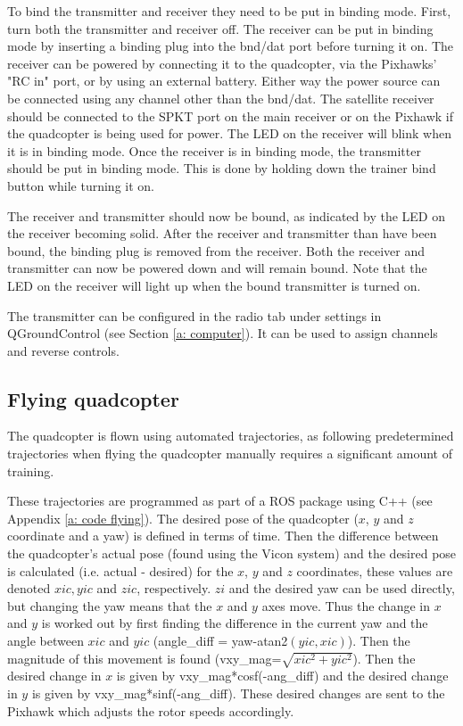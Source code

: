 \documentclass[12pt,a4paper]{article}
\begin{document}
    To bind the transmitter and receiver they need to be put in binding mode. First, turn both the transmitter and receiver off. The receiver can be put in binding mode by inserting a binding plug into the bnd/dat port before turning it on. The receiver can be powered by connecting it to the quadcopter, via the Pixhawks' "RC in" port, or by using an external battery. Either way the power source can be connected using any channel other than the bnd/dat. The satellite receiver should be connected to the SPKT port on the main receiver or on the Pixhawk if the quadcopter is being used for power. The LED on the receiver will blink when it is in binding mode. Once the receiver is in binding mode, the transmitter should be put in binding mode. This is done by holding down the trainer bind button while turning it on.
     
    The receiver and transmitter should now be bound, as indicated by the LED on the receiver becoming solid. After the receiver and transmitter than have been bound, the binding plug is removed from the receiver. Both the receiver and transmitter can now be powered down and will remain bound. Note that the LED on the receiver will light up when the bound transmitter is turned on.
     
    The transmitter can be configured in the radio tab under settings in QGroundControl (see Section \ref{a: computer}). It can be used to assign channels and reverse controls. 

  \subsection{Flying quadcopter}
    \label{ssec: flying quad}
    The quadcopter is flown using automated trajectories, as following predetermined trajectories when flying the quadcopter manually requires a significant amount of training. 
     
    These trajectories are programmed as part of a ROS package using C++ (see Appendix \ref{a: code flying}). The desired pose of the quadcopter ($x$, $y$ and $z$ coordinate and a yaw) is defined in terms of time. Then the difference between the quadcopter's actual pose (found using the Vicon system) and the desired pose is calculated (i.e. actual - desired) for the $x$, $y$ and $z$ coordinates, these values are denoted $xic,yic$ and $zic$, respectively. $zi$ and the desired yaw can be used directly, but changing the yaw means that the $x$ and $y$ axes move. Thus the change in $x$ and $y$ is worked out by first finding the difference in the current yaw and the angle between $xic$ and $yic$ (angle\_diff = yaw-atan2$(yic,xic)$). Then the magnitude of this movement is found (vxy\_mag=$\sqrt{xic^2+yic^2}$). Then the desired change in $x$ is given by vxy\_mag*cosf(-ang\_diff) and the desired change in $y$ is given by vxy\_mag*sinf(-ang\_diff). These desired changes are sent to the Pixhawk which adjusts the rotor speeds accordingly.
     
\end{document}
